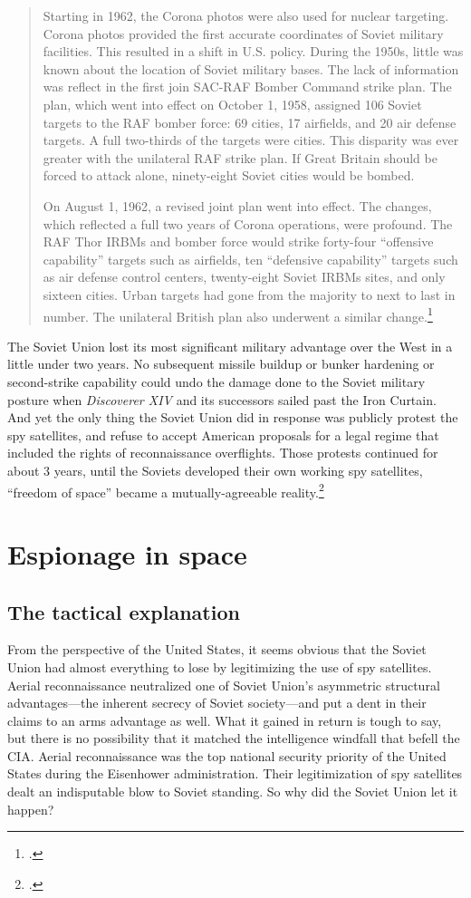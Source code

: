 \documentclass{memoir}
\begin{document}
\begin{quote}
Starting in 1962, the Corona photos were also used for nuclear targeting. Corona photos provided the first accurate coordinates of Soviet military facilities. This resulted in a shift in U.S. policy. During the 1950s, little was known about the location of Soviet military bases. The lack of information was reflect in the first join SAC-RAF Bomber Command strike plan. The plan, which went into effect on October 1, 1958, assigned 106 Soviet targets to the RAF bomber force: 69 cities, 17 airfields, and 20 air defense targets. A full two-thirds of the targets were cities. This disparity was ever greater with the unilateral RAF strike plan. If Great Britain should be forced to attack alone, ninety-eight Soviet cities would be bombed.

On August 1, 1962, a revised joint plan went into effect. The changes, which reflected a full two years of Corona operations, were profound. The RAF Thor IRBMs and bomber force would strike forty-four ``offensive capability'' targets such as airfields, ten ``defensive capability'' targets such as air defense control centers, twenty-eight Soviet IRBMs sites, and only sixteen cities. Urban targets had gone from the majority to next to last in number. The unilateral British plan also underwent a similar change.\footcite[p.~139]{peebles_corona_1997}
\end{quote}
The Soviet Union lost its most significant military advantage over the West in a little under two years. No subsequent missile buildup or bunker hardening or second-strike capability could undo the damage done to the Soviet military posture when \emph{Discoverer XIV} and its successors sailed past the Iron Curtain. And yet the only thing the Soviet Union did in response was publicly protest the spy satellites, and refuse to accept American proposals for a legal regime that included the rights of reconnaissance overflights. Those protests continued for about 3 years, until the Soviets developed their own working spy satellites, ``freedom of space'' became a mutually-agreeable reality.\footcite[p.~271-275]{mcdougall_heavens_1985}

\section{Espionage in space}
\subsection{The tactical explanation}
From the perspective of the United States, it seems obvious that the Soviet Union had almost everything to lose by legitimizing the use of spy satellites. Aerial reconnaissance neutralized one of Soviet Union's asymmetric structural advantages---the inherent secrecy of Soviet society---and put a dent in their claims to an arms advantage as well. What it gained in return is tough to say, but there is no possibility that it matched the intelligence windfall that befell the CIA. Aerial reconnaissance was the top national security priority of the United States during the Eisenhower administration. Their legitimization of spy satellites dealt an indisputable blow to Soviet standing. So why did the Soviet Union let it happen?
\end{document}
